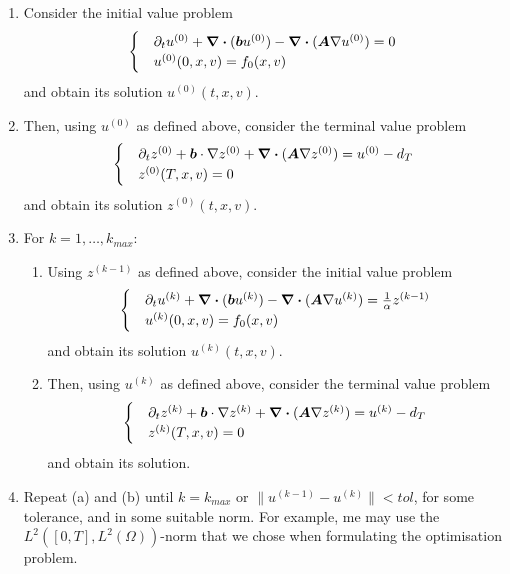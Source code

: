 \begin{enumerate}
    \item Consider the initial value problem
    \begin{align} 
        \begin{cases}
        &\partial_t u^{(0)} + \div{(\boldsymbol{b}u^{(0)})} - \div{(\boldsymbol{A} \nabla u^{(0)})} = 0\\
        &u^{(0)}(0,x,v) = f_0(x,v)
        \end{cases}
    \end{align}
    and obtain its solution $u^{(0)}(t,x,v)$.
    \item Then, using $u^{(0)}$ as defined above, consider the terminal value problem 
    \begin{align} 
        \begin{cases} 
            &\partial_t z^{(0)} + \boldsymbol{b} \cdot \nabla z^{(0)} + \div{(\boldsymbol{A} \nabla z^{(0)})} = u^{(0)} - d_T\\
            &z^{(0)}(T,x,v) = 0
        \end{cases}
    \end{align}
    and obtain its solution $z^{(0)}(t,x,v)$.
    \item For $k=1,\dots,k_{max}$:
    \begin{enumerate}
        \item Using $z^{(k-1)}$ as defined above, consider the initial value problem 
        \begin{align}
            \label{eq:primal-iteration} 
            \begin{cases}
                &\partial_t u^{(k)} + \div{(\boldsymbol{b}u^{(k)})} - \div{(\boldsymbol{A} \nabla u^{(k)})} = \frac{1}{\alpha} z^{(k-1)}\\
                &u^{(k)}(0,x,v) = f_0(x,v)
            \end{cases}
        \end{align}
        and obtain its solution $u^{(k)}(t,x,v)$.
        \item Then, using $u^{(k)}$ as defined above, consider the terminal value problem 
        \begin{align}
            \label{eq:dual-iteration}
            \begin{cases}
                &\partial_t z^{(k)} + \boldsymbol{b} \cdot \nabla z^{(k)} + \div{(\boldsymbol{A} \nabla z^{(k)})} = u^{(k)} - d_T\\
                &z^{(k)}(T,x,v) = 0
            \end{cases} 
        \end{align} 
        and obtain its solution.
    \end{enumerate}
    \item Repeat (a) and (b) until $k=k_{max}$ or $\lVert u^{(k-1)} - u^{(k)} \rVert < tol$, for some tolerance, and in some suitable norm. For example, me may use the $L^2([0,T],L^2(\Omega))$-norm that we chose when formulating the optimisation problem.
\end{enumerate}


